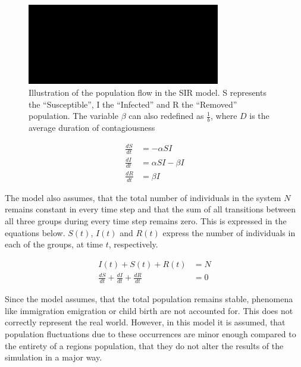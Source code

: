 \begin{figure}
	\begin{center}
		\includegraphics[width=0.75\textwidth]{./figures/SIR.png}
		\caption{Illustration of the population flow in the SIR model. S represents the ``Susceptible'', I
			the ``Infected'' and R the ``Removed'' population. The variable $\beta$ can also redefined
			as $\frac{1}{b}$, where $D$ is the average duration of contagiousness}
		\label{fig:SIR}
	\end{center}
\end{figure}


\begin{align}
	\label{eq:SIR1}
	\frac{dS}{dt} &= -\alpha S I \\
	\frac{dI}{dt} &= \alpha S I - \beta I \\
	\frac{dR}{dt} &= \beta I
\end{align}


The model also assumes, that the total number of individuals in the system $N$ remains constant in every time step and
that the sum of all transitions between all three groups during every time step remains zero. This is expressed in the equations below.
$S(t)$, $I(t)$ and $R(t)$ express the number of individuals in each of the groups, at time $t$, respectively.

\begin{align}
	\label{eq:SIR2}
	I(t) + S(t) + R(t) &= N \\
	\frac{dS}{dt} + \frac{dI}{dt} + \frac{dR}{dt} &= 0
\end{align}


Since the model assumes, that the total population remains stable, phenomena like immigration emigration or child birth are not accounted
for. This does not correctly represent the real world. However, in this model it is assumed, that population fluctuations
due to these occurrences are minor enough compared to the entirety of a regions population, that they do not alter the results of the
simulation in a major way\cite{??}.\newline


